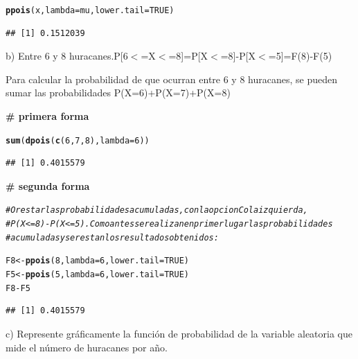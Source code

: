\documentclass[12pt,letterpaper]{article}\usepackage[]{graphicx}\usepackage[]{color}
\makeatletter
\newcommand{\hlnum}[1]{\textcolor[rgb]{0.686,0.059,0.569}{#1}}%
\newcommand{\hlcom}[1]{\textcolor[rgb]{0.678,0.584,0.686}{\textit{#1}}}%
\newcommand{\hlopt}[1]{\textcolor[rgb]{0,0,0}{#1}}%
\newcommand{\hlstd}[1]{\textcolor[rgb]{0.345,0.345,0.345}{#1}}%
\newcommand{\hlkwb}[1]{\textcolor[rgb]{0.69,0.353,0.396}{#1}}%
\newcommand{\hlkwc}[1]{\textcolor[rgb]{0.333,0.667,0.333}{#1}}%
\newcommand{\hlkwd}[1]{\textcolor[rgb]{0.737,0.353,0.396}{\textbf{#1}}}%
\newenvironment{kframe}{%
 \def\at@end@of@kframe{}%
 \ifinner\ifhmode%
  \def\at@end@of@kframe{\end{minipage}}%
  \begin{minipage}{\columnwidth}%
 \fi\fi%
 \def\FrameCommand##1{\hskip\@totalleftmargin \hskip-\fboxsep
 \colorbox{shadecolor}{##1}\hskip-\fboxsep
     \hskip-\linewidth \hskip-\@totalleftmargin \hskip\columnwidth}%
 \MakeFramed {\advance\hsize-\width
   \@totalleftmargin\z@ \linewidth\hsize
   \@setminipage}}%
 {\par\unskip\endMakeFramed%
 \at@end@of@kframe}
\newenvironment{knitrout}{}{} %
\makeatother
\begin{document}
\begin{itemize}
\begin{knitrout}
\begin{kframe}
\begin{alltt}
\hlkwd{ppois}\hlstd{(x,} \hlkwc{lambda} \hlstd{= mu,} \hlkwc{lower.tail}\hlstd{=}\hlnum{TRUE}\hlstd{)}
\end{alltt}
\begin{verbatim}
## [1] 0.1512039
\end{verbatim}
\end{kframe}
\end{knitrout}
\begin{description}
\item b) Entre 6 y 8 huracanes.P[6$<$=X$<$=8]=P[X$<$=8]-P[X$<$=5]=F(8)-F(5)
\end{description}
Para calcular la probabilidad de que ocurran entre 6 y 8 huracanes, se pueden sumar las probabilidades P(X=6)+P(X=7)+P(X=8)

\textbf{# primera forma}
\begin{knitrout}
\color{fgcolor}\begin{kframe}
\begin{alltt}
\hlkwd{sum}\hlstd{(}\hlkwd{dpois}\hlstd{(}\hlkwd{c}\hlstd{(}\hlnum{6}\hlstd{,}\hlnum{7}\hlstd{,}\hlnum{8}\hlstd{),}\hlkwc{lambda} \hlstd{=} \hlnum{6}\hlstd{))}
\end{alltt}
\begin{verbatim}
## [1] 0.4015579
\end{verbatim}
\end{kframe}
\end{knitrout}

\textbf{# segunda forma}
\begin{knitrout}
\color{fgcolor}\begin{kframe}
\begin{alltt}
\hlcom{# O restar las probabilidades acumuladas, con la opcion Cola izquierda, }
\hlcom{# P(X<=8)-P(X<=5).Como antes se realizan en primer lugar las probabilidades }
\hlcom{# acumuladas y se restan los resultados obtenidos:}

\hlstd{F8} \hlkwb{<-} \hlkwd{ppois}\hlstd{(}\hlnum{8}\hlstd{,} \hlkwc{lambda} \hlstd{=} \hlnum{6}\hlstd{,} \hlkwc{lower.tail}\hlstd{=}\hlnum{TRUE}\hlstd{)}
\hlstd{F5} \hlkwb{<-} \hlkwd{ppois}\hlstd{(}\hlnum{5}\hlstd{,}\hlkwc{lambda} \hlstd{=} \hlnum{6}\hlstd{,} \hlkwc{lower.tail}\hlstd{=}\hlnum{TRUE}\hlstd{)}
\hlstd{F8} \hlopt{-} \hlstd{F5}
\end{alltt}
\begin{verbatim}
## [1] 0.4015579
\end{verbatim}
\end{kframe}
\end{knitrout}
\begin{description}
  \item c) Represente gr\'aficamente la funci\'on de probabilidad de la variable aleatoria que mide el n\'umero de huracanes por a\~no.
\end{description}


\end{itemize}
\end{document}
